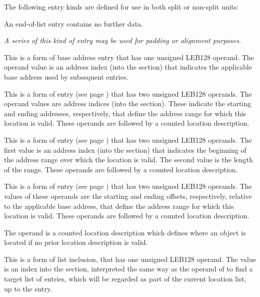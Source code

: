 The following entry kinds are defined for use in both
split or non-split units:
   
\begin{enumerate}[1. ]
\itembfnl{\DWLLEendoflistTARG}
An end-of-list entry contains no further data.
       
\textit{A series of this kind of entry may be used for padding or
alignment purposes.}


\itembfnl{\DWLLEbaseaddressxTARG}
This is a form of base address entry that has one unsigned
LEB128 operand. The operand value is an address index (into the 
\dotdebugaddr{} section) that indicates the applicable base address 
used by subsequent \DWLLEoffsetpair{} entries.

\itembfnl{\DWLLEstartxendxTARG}
This is a form of  entry
\bb
(see page \pageref{text:bndlocdesc})
\eb
that has two unsigned LEB128 operands. The operand values are
address indices (into the \dotdebugaddr{} section). These indicate the
starting and ending addresses, respectively, that define
the address range for which this location is valid.
These operands are followed by a counted location description.

\itembfnl{\DWLLEstartxlengthTARG}
This is a form of  entry
\bb
(see page \pageref{text:bndlocdesc})
\eb
that has two unsigned LEB128 operands. The first value is an address index 
(into the \dotdebugaddr{} section)
that indicates the beginning of the address range over
which the location is valid.
The second value is the length of the range.
These operands are followed by a counted location description.

\itembfnl{\DWLLEoffsetpairTARG}
This is a form of  entry
\bb
(see page \pageref{text:bndlocdesc})
\eb
that has two unsigned LEB128 operands. The values of these
operands are the starting and ending offsets, respectively,
relative to the applicable base address, that define the
address range for which this location is valid.
These operands are followed by a counted location description.
       
\itembfnl{\DWLLEdefaultlocationTARG}
The operand is a counted location description which defines 
where an object is located if no prior location description 
is valid.

\bb
\itembfnl{\DWLLEincludeloclistxTARG}
This is a form of list inclusion, that has one unsigned LEB128
operand.  The value is an index into the \dotdebugloclists{} section,
interpreted the same way as the operand of \DWFORMloclistx{} to find
a target list of entries, which will be regarded as part of the
current location list, up to the \DWLLEendoflist{} entry.
\eb

\end{enumerate}
      
